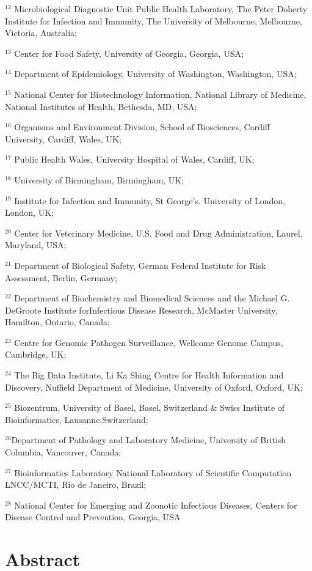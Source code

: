 $^{12}$  Microbiological Diagnostic Unit Public Health Laboratory, The Peter Doherty Institute for Infection and Immunity, The University of Melbourne, Melbourne, Victoria, Australia;

$^{13}$ Center for Food Safety, University of Georgia, Georgia, USA;

$^{14}$ Department of Epidemiology, University of Washington, Washington, USA;

$^{15}$ National Center for Biotechnology Information, National Library of Medicine, National Institutes of Health, Bethesda, MD, USA;

$^{16}$ Organisms and Environment Division, School of Biosciences, Cardiff University, Cardiff, Wales, UK;

$^{17}$ Public Health Wales, University Hospital of Wales, Cardiff, UK;

$^{18}$ University of Birmingham, Birmingham, UK;

$^{19}$ Institute for Infection and Immunity, St George’s, University of London, London, UK;

$^{20}$ Center for Veterinary Medicine, U.S. Food and Drug Administration, Laurel, Maryland, USA;

$^{21}$ Department of Biological Safety, German Federal Institute for Risk Assessment, Berlin, Germany;

$^{22}$ Department of Biochemistry and Biomedical Sciences and the Michael G. DeGroote Institute forInfectious Disease Research, McMaster University, Hamilton, Ontario, Canada;

$^{23}$ Centre for Genomic Pathogen Surveillance, Wellcome Genome Campus, Cambridge, UK;

$^{24}$ The Big Data Institute, Li Ka Shing Centre for Health Information and Discovery, Nuffield Department of Medicine, University of Oxford, Oxford, UK;

$^{25}$ Biozentrum, University of Basel, Basel, Switzerland \& Swiss Institute of Bioinformatics, Lausanne,Switzerland;

$^{26}$Department of Pathology and Laboratory Medicine, University of British Columbia, Vancouver, Canada;

$^{27}$ Bioinformatics Laboratory National Laboratory of Scientific Computation LNCC/MCTI, Rio de Janeiro, Brazil;

$^{28}$ National Center for Emerging and Zoonotic Infectious Diseases, Centers for Disease Control and Prevention, Georgia, USA

\section{Abstract} \label{sec:ch7_abstract}

